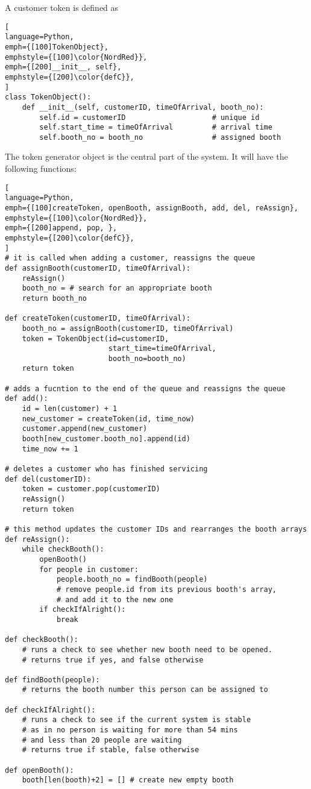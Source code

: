 \documentclass[article, 12pt, a4paper]{memoir}
\begin{document}
\begin{solution}
    [f]
    A customer token is defined as

\begin{lstlisting}[
language=Python,
emph={[100]TokenObject},
emphstyle={[100]\color{NordRed}},
emph={[200]__init__, self},
emphstyle={[200]\color{defC}},
]
class TokenObject():
    def __init__(self, customerID, timeOfArrival, booth_no):
        self.id = customerID                    # unique id
        self.start_time = timeOfArrival         # arrival time
        self.booth_no = booth_no                # assigned booth
\end{lstlisting}
    
    
    The token generator object is the central part of the system. It will have the
    following functions:

\begin{lstlisting}[
language=Python,
emph={[100]createToken, openBooth, assignBooth, add, del, reAssign},
emphstyle={[100]\color{NordRed}},
emph={[200]append, pop, },
emphstyle={[200]\color{defC}},
]
# it is called when adding a customer, reassigns the queue
def assignBooth(customerID, timeOfArrival):
    reAssign()
    booth_no = # search for an appropriate booth
    return booth_no

def createToken(customerID, timeOfArrival):
    booth_no = assignBooth(customerID, timeOfArrival)
    token = TokenObject(id=customerID,
                        start_time=timeOfArrival,
                        booth_no=booth_no)
    return token

# adds a fucntion to the end of the queue and reassigns the queue
def add():
    id = len(customer) + 1
    new_customer = createToken(id, time_now)
    customer.append(new_customer)
    booth[new_customer.booth_no].append(id)
    time_now += 1

# deletes a customer who has finished servicing
def del(customerID):
    token = customer.pop(customerID)
    reAssign()
    return token

# this method updates the customer IDs and rearranges the booth arrays
def reAssign():
    while checkBooth():
        openBooth()
        for people in customer:
            people.booth_no = findBooth(people)
            # remove people.id from its previous booth's array,
            # and add it to the new one
        if checkIfAlright():
            break

def checkBooth():
    # runs a check to see whether new booth need to be opened.
    # returns true if yes, and false otherwise

def findBooth(people):
    # returns the booth number this person can be assigned to

def checkIfAlright():
    # runs a check to see if the current system is stable
    # as in no person is waiting for more than 54 mins
    # and less than 20 people are waiting
    # returns true if stable, false otherwise

def openBooth():
    booth[len(booth)+2] = [] # create new empty booth
\end{lstlisting}
\end{solution}
\end{document}
